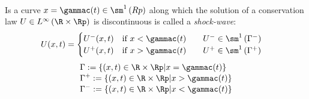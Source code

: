   \begin{defnbox}\nospacing
      \begin{defn}\label{defn:shock_waves}\leavevmode\\
          Is a curve $x=\gammac(t)\in\sm^{1}\left(Rp\right)$ along which the solution of a conservation law $U\in L^{\infty}\left(\R\times\Rp\right)$
          is discontinuous is called a \textit{shock-wave}:
          \begin{align}
            &U(x,t)=
            \begin{cases}
                U^{-}(x,t)&\text{if }x<\gammac(t)\qquad U^{-}\in\sm^1\left(\Gamma^{-}\right)\\
                U^{+}(x,t)&\text{if }x>\gammac(t)\qquad U^{+}\in\sm^1\left(\Gamma^{+}\right)
            \end{cases}\nonumber
          \end{align}
        \begin{align}
                        &\Gamma:=\left\{(x,t)\in\R\times\Rp|x=\gammac(t)\right\}\nonumber\\[-1\jot]
                        &\Gamma^{+}:=\left\{(x,t)\in\R\times\Rp|x>\gammac(t)\right\}\label{eq:shock_wave}\\[-1\jot]
                        &\Gamma^{-}:=\left\{(x,t)\in\R\times\Rp|x<\gammac(t)\right\}\nonumber
        \end{align}
      \end{defn}
  \end{defnbox}
